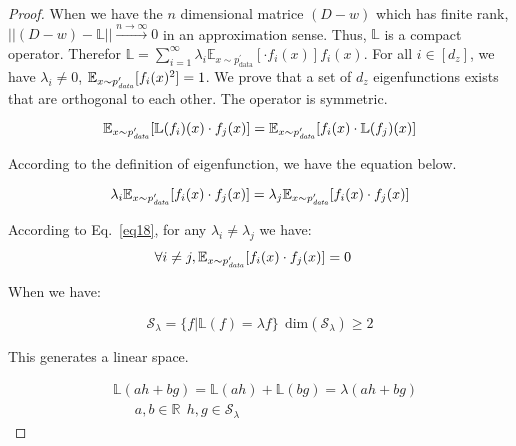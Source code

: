 \documentclass{article}
\begin{document}
\begin{proof}



When we have the $n$ dimensional matrice $(D-w)$ which has finite rank, $||(D-w) - \mathbb{L}|| \xrightarrow{n \to \infty} 0 $ in an approximation sense. Thus, $\mathbb{L}$ is a compact operator. Therefor $\mathbb{L}=\sum_{i=1}^\infty \lambda_i \mathbb{E}_{x\sim p_{\text{data}}^\prime}[\cdot f_i(x)] f_i(x)$. For all $i \in [d_z] $, we have $\lambda_i \neq 0 $,  $ \mathbb{E}_{x \sim p_{\text{\textit{data}}}^\prime}[f_i(x)^2] = 1$. We prove that a set of $d_z$ eigenfunctions exists that are orthogonal to each other. The operator is symmetric.

\begin{equation}\label{eq:symetric}
    \mathbb{E}_{x \sim p_{\text{\textit{data}}}^\prime}[\mathbb{L}(f_i)(x) \cdot f_j(x)] = \mathbb{E}_{x \sim p_{\text{\textit{data}}}^\prime}[f_i(x) \cdot \mathbb{L}(f_j)(x)]
\end{equation}


According to the definition of eigenfunction, we have the equation below.

\begin{equation}\label{eq18}
    \lambda_i \mathbb{E}_{x \sim p_{\text{\textit{data}}}^\prime}[f_i(x) \cdot f_j(x)] =  \lambda_j \mathbb{E}_{x \sim p_{\text{\textit{data}}}^\prime}[f_i(x) \cdot f_j(x)]
\end{equation}

According to Eq.~\ref{eq18}, for any $\lambda_i \neq \lambda_j$ we have:
\begin{equation}
\begin{aligned}
     &   \forall i\neq j, \mathbb{E}_{x \sim p_{\text{\textit{data}}}^\prime}[f_i(x) \cdot f_j(x)] = 0
\end{aligned}
\end{equation}

When we have:

\begin{equation}
    \mathcal{S}_{\lambda} = \{f | \mathbb{L}(f)=\lambda f\} \ \ \text{dim}(\mathcal{S}_{\lambda}) \geq 2
\end{equation}

This generates a linear space.

\begin{equation}
\begin{aligned}
    & \mathbb{L}(ah + bg) = \mathbb{L}(ah) + \mathbb{L}(bg) = \lambda(ah + bg)  \\
    & \ \ \ \ \ \ \  a,b\in \mathbb{R} \ \ h,g \in \mathcal{S}_{\lambda} 
\end{aligned}
\end{equation}


\end{proof}
\end{document}
